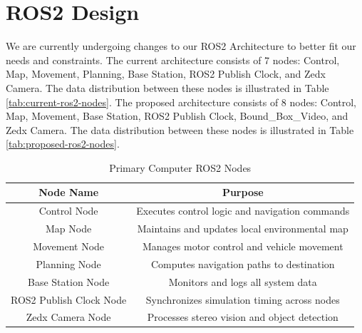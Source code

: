 %
%
%
%
\section{ROS2 Design}

We are currently undergoing changes to our ROS2 Architecture to better fit our needs and constraints.
The current architecture consists of 7 nodes: Control, Map, Movement, Planning, Base Station, ROS2 Publish Clock, and Zedx Camera. The data distribution between these nodes is illustrated in Table \ref{tab:current-ros2-nodes}.
The proposed architecture consists of 8 nodes: Control, Map, Movement, Base Station, ROS2 Publish Clock, Bound\_Box\_Video, and Zedx Camera. The data distribution between these nodes is illustrated in Table \ref{tab:proposed-ros2-nodes}.

\begin{table}[H]
    \centering
    \begin{tabular}{|c|c|}
        \hline
        \textbf{Node Name} & \textbf{Purpose} \\
        \hline
        Control Node & Executes control logic and navigation commands \\
        Map Node & Maintains and updates local environmental map \\
        Movement Node & Manages motor control and vehicle movement \\
        Planning Node & Computes navigation paths to destination \\
        Base Station Node & Monitors and logs all system data \\
        ROS2 Publish Clock Node & Synchronizes simulation timing across nodes \\
        Zedx Camera Node & Processes stereo vision and object detection \\
        \hline
    \end{tabular}
    \caption{Primary Computer ROS2 Nodes}
    \label{tab:ros2-nodes-overview}
\end{table}

